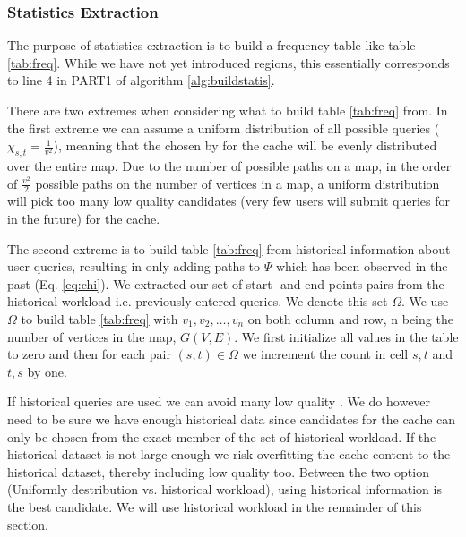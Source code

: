 \subsubsection{Statistics Extraction}\label{sec:statextract}


The purpose of statistics extraction is to build a frequency table like table \ref{tab:freq}. While we have not yet introduced regions, this essentially corresponds to line 4 in PART1 of algorithm \ref{alg:buildstatis}.

There are two extremes when considering what to build table \ref{tab:freq} from. 
In the first extreme we can assume a uniform distribution of all possible queries ($\chi_{s,t} = \frac{1}{v^2}$), meaning that the \spaths chosen by \salgo for the cache will be evenly distributed over the entire map. Due to the number of possible paths on a map, in the order of $\frac{v^2}{2}$ possible paths on the number of vertices in a map, a uniform distribution will pick too many low quality candidates (\spaths very few users will submit queries for in the future) for the cache. 

The second extreme is to build table \ref{tab:freq} from historical information about user queries, resulting in \salgo only adding paths to $\Psi$ which has been observed in the past (Eq. \ref{eq:chi}). We extracted our set of start- and end-points pairs from the historical workload i.e. previously entered \spath queries. We denote this set $\Omega$. We use $\Omega$ to build table \ref{tab:freq} with $v_1,v_2,\ldots,v_n$ on both column and row, n being the number of vertices in the map, $G(V,E)$. We first initialize all values in the table to zero and then for each pair $(s,t) \in \Omega$ we increment the count in cell $s,t$ and $t,s$ by one.

If historical queries are used we can avoid many low quality \spathsns. We do however need to be sure we have enough historical data since candidates for the cache can only be chosen from the exact member of the set of historical workload. If the historical dataset is not large enough we risk overfitting the cache content to the historical dataset, thereby including low quality \spaths too. Between the two option (Uniformly destribution vs. historical workload), using historical information is the best candidate. We will use historical workload in the remainder of this section.


